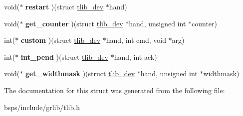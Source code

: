 \begin{DoxyCompactItemize}
\item 
\mbox{\label{structtlib__drv_a2bec1311a2d7ac5d517c0e9ca14eddb8}} 
void($\ast$ {\bfseries restart} )(struct \mbox{\hyperlink{structtlib__dev}{tlib\+\_\+dev}} $\ast$hand)
\item 
\mbox{\label{structtlib__drv_a84eaa3f706892c45ad5117d842184fd6}} 
void($\ast$ {\bfseries get\+\_\+counter} )(struct \mbox{\hyperlink{structtlib__dev}{tlib\+\_\+dev}} $\ast$hand, unsigned int $\ast$counter)
\item 
\mbox{\label{structtlib__drv_a229e8de73eaa3a568b6ab0bed1d2eac1}} 
int($\ast$ {\bfseries custom} )(struct \mbox{\hyperlink{structtlib__dev}{tlib\+\_\+dev}} $\ast$hand, int cmd, void $\ast$arg)
\item 
\mbox{\label{structtlib__drv_a2975f49c43634a9be9d993840a087edc}} 
int($\ast$ {\bfseries int\+\_\+pend} )(struct \mbox{\hyperlink{structtlib__dev}{tlib\+\_\+dev}} $\ast$hand, int ack)
\item 
\mbox{\label{structtlib__drv_a0d7f4321e67bfed2019dd5faaa4835f6}} 
void($\ast$ {\bfseries get\+\_\+widthmask} )(struct \mbox{\hyperlink{structtlib__dev}{tlib\+\_\+dev}} $\ast$hand, unsigned int $\ast$widthmask)
\end{DoxyCompactItemize}


The documentation for this struct was generated from the following file\+:\begin{DoxyCompactItemize}
\item 
bsps/include/grlib/tlib.\+h\end{DoxyCompactItemize}
